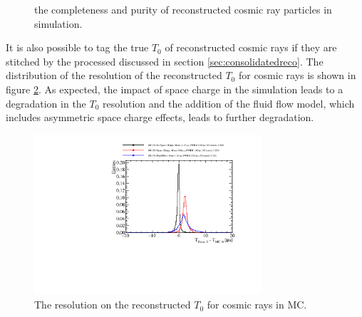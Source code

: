 \begin{figure}
\caption{\protect{} the completeness and \protect{} purity of reconstructed cosmic ray particles in simulation.}
\label{fig:crrecopurcom}
\end{figure}

It is also possible to tag the true $T_{0}$ of reconstructed cosmic rays if they are stitched by the processed discussed in section \ref{sec:consolidatedreco}.  The distribution of the resolution of the reconstructed $T_{0}$ for cosmic rays is shown in figure \ref{fig:crt0res}.  As expected, the impact of space charge  in the simulation leads to a degradation in the $T_{0}$ resolution and the addition of the fluid flow model, which includes asymmetric space charge effects, leads to further degradation.  

\begin{figure}
\centering
\includegraphics[width=0.75\textwidth]{Figures/Metrics/MC/Cosmics/CosmicRayT0Resolustion.pdf}
\caption{The resolution on the reconstructed $T_{0}$ for cosmic rays in MC.}
\label{fig:crt0res}
\end{figure}


